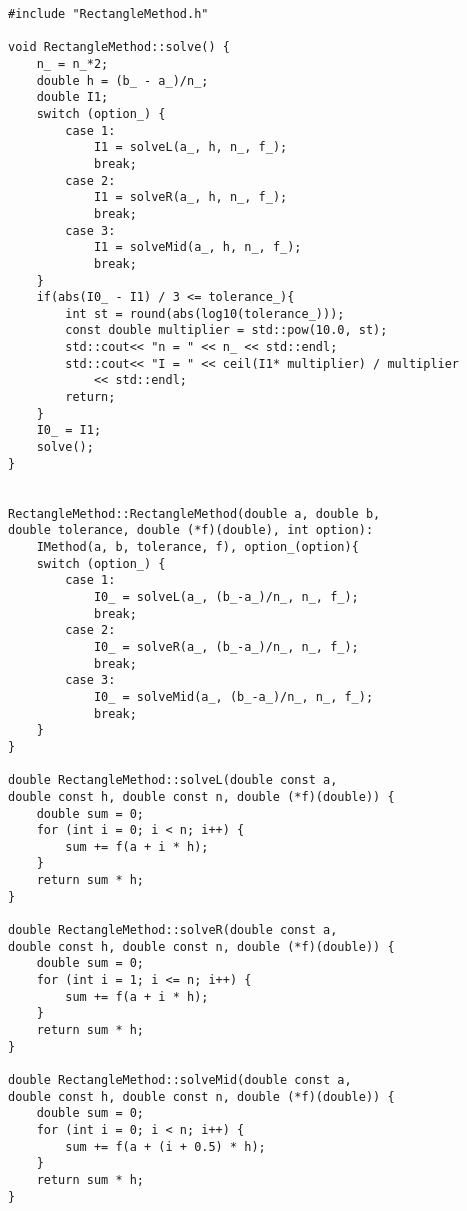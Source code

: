 \begin{lstlisting}
#include "RectangleMethod.h"

void RectangleMethod::solve() {
    n_ = n_*2;
    double h = (b_ - a_)/n_;
    double I1;
    switch (option_) {
        case 1:
            I1 = solveL(a_, h, n_, f_);
            break;
        case 2:
            I1 = solveR(a_, h, n_, f_);
            break;
        case 3:
            I1 = solveMid(a_, h, n_, f_);
            break;
    }
    if(abs(I0_ - I1) / 3 <= tolerance_){
        int st = round(abs(log10(tolerance_)));
        const double multiplier = std::pow(10.0, st);
        std::cout<< "n = " << n_ << std::endl;
        std::cout<< "I = " << ceil(I1* multiplier) / multiplier
            << std::endl;
        return;
    }
    I0_ = I1;
    solve();
}


RectangleMethod::RectangleMethod(double a, double b,
double tolerance, double (*f)(double), int option):
    IMethod(a, b, tolerance, f), option_(option){
    switch (option_) {
        case 1:
            I0_ = solveL(a_, (b_-a_)/n_, n_, f_);
            break;
        case 2:
            I0_ = solveR(a_, (b_-a_)/n_, n_, f_);
            break;
        case 3:
            I0_ = solveMid(a_, (b_-a_)/n_, n_, f_);
            break;
    }
}

double RectangleMethod::solveL(double const a,
double const h, double const n, double (*f)(double)) {
    double sum = 0;
    for (int i = 0; i < n; i++) {
        sum += f(a + i * h);
    }
    return sum * h;
}

double RectangleMethod::solveR(double const a,
double const h, double const n, double (*f)(double)) {
    double sum = 0;
    for (int i = 1; i <= n; i++) {
        sum += f(a + i * h);
    }
    return sum * h;
}

double RectangleMethod::solveMid(double const a,
double const h, double const n, double (*f)(double)) {
    double sum = 0;
    for (int i = 0; i < n; i++) {
        sum += f(a + (i + 0.5) * h);
    }
    return sum * h;
}
\end{lstlisting}